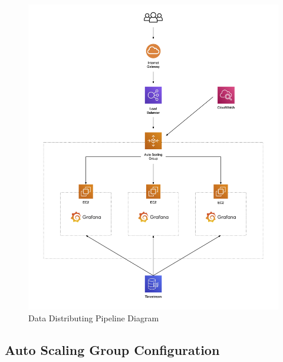 \documentclass[12pt,oneside]{book} %
\begin{document}
\begin{figure}[H]
    \centering
    \includegraphics[width=1\linewidth]{images/cloud-computing-clients.png}
    \caption{Data Distributing Pipeline Diagram}
\end{figure}

\subsection{Auto Scaling Group Configuration}
\end{document}
